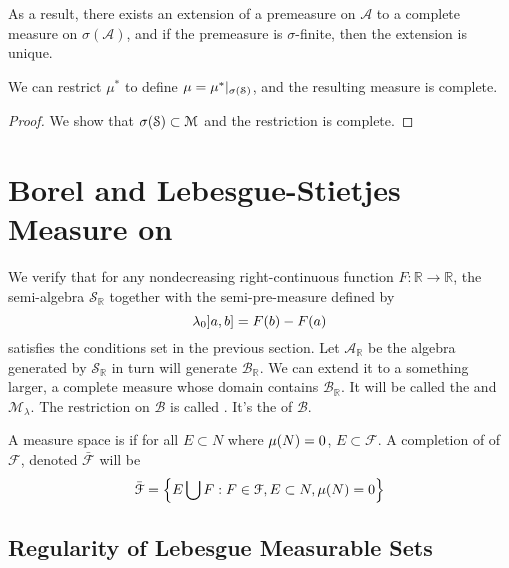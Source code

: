 \begin{remark}
    As a result, there exists an extension of a premeasure on \(\mathcal{A}\) to a complete measure on \(\sigma(\mathcal{A})\), and if the premeasure is \(\sigma\)-finite, then the extension is unique. 
\end{remark}

\begin{thm}
    We can restrict \(\mu^{*}\) to define \(\mu= \mu^{*}|_{\sigma\pqty{\mathcal{S}}}\), and the resulting measure is complete. 
\end{thm}

\begin{proof}
    We show that \(\sigma\pqty{\mathcal{S}}\subset \mathcal{M}\) and the restriction is complete. 
\end{proof}

\section{Borel and Lebesgue-Stietjes Measure on }

We verify that for any nondecreasing right-continuous function \(F: \mathbb{R}\to \mathbb{R}\), the semi-algebra \(\mathcal{S}_{\mathbb{R}}\) together with the semi-pre-measure defined by 
\begin{equation*}
    \lambda_{0} \linterval{a}{b} = F(b) - F(a)
\end{equation*}
satisfies the conditions set in the previous section. Let \(\mathcal{A}_{\mathbb{R}}\) be the algebra generated by \(\mathcal{S}_{\mathbb{R}}\) in turn will generate \(\mathcal{B}_{\mathbb{R}}\). We can extend it to a something larger, a complete measure whose domain contains \(\mathcal{B}_{\mathbb{R}}\). It will be called the  and  \(\mathcal{M}_{\lambda}\). The restriction on \(\mathcal{B}\) is called . It's the  of \(\mathcal{B}\).

A measure space is  if for all \(E\subset N\) where \(\mu\pqty{N}=0\), \(E\subset \mathcal{F}\). A completion of of \(\mathcal{F}\), denoted \(\bar{\mathcal{F}}\) will be 
\begin{equation*}
    \bar{\mathcal{F}} = \Bqty{E \cup F: F\in \mathcal{F}, E\subset N, \mu(N) = 0}
\end{equation*}

\subsection{Regularity of Lebesgue Measurable Sets}


